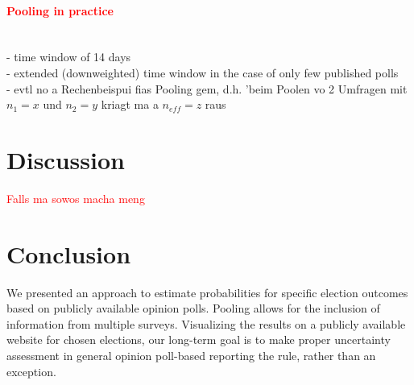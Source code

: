 \documentclass[smallcondensed]{svjour3}     %
\newcommand{\red}[1]{\textcolor{red}{#1}}
\begin{document}
\paragraph{\red{Pooling in practice}} \ \\
- time window of 14 days \\
- extended (downweighted) time window in the case of only few published polls \\
- evtl no a Rechenbeispui fias Pooling gem, d.h. 'beim Poolen vo 2 Umfragen mit $n_1 = x$ und $n_2 = y$ kriagt ma a $n_{eff} = z$ raus



\section{Discussion} \label{sec:discussion}
\red{Falls ma sowos macha meng}

\section{Conclusion} \label{sec:conclusion}
We presented an approach to estimate probabilities for specific election outcomes based on publicly available opinion polls. Pooling allows for the inclusion of information from multiple surveys. Visualizing the results on a publicly available website for chosen elections, our long-term goal is to make proper uncertainty assessment
in general opinion poll-based reporting the rule, rather than an exception.



%
\end{document}
